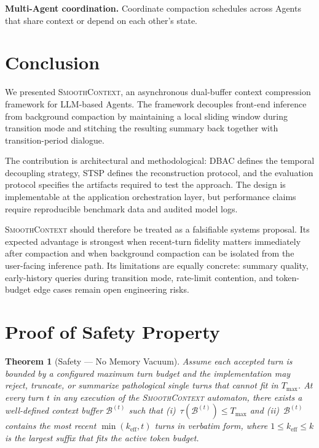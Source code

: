 \documentclass[10pt,twocolumn]{article}
\newtheorem{theorem}{Theorem}
\newcommand{\sys}{\textsc{SmoothContext}}
\newcommand{\Dtok}{\tau}
\newcommand{\Tmax}{T_{\max}}
\begin{document}
\textbf{Multi-Agent coordination.} Coordinate compaction schedules across Agents that share context or depend on each other's state.


\section{Conclusion}\label{sec:conclusion}

We presented \sys{}, an asynchronous dual-buffer context compression framework for LLM-based Agents. The framework decouples front-end inference from background compaction by maintaining a local sliding window during transition mode and stitching the resulting summary back together with transition-period dialogue.

The contribution is architectural and methodological: DBAC defines the temporal decoupling strategy, STSP defines the reconstruction protocol, and the evaluation protocol specifies the artifacts required to test the approach. The design is implementable at the application orchestration layer, but performance claims require reproducible benchmark data and audited model logs.

\sys{} should therefore be treated as a falsifiable systems proposal. Its expected advantage is strongest when recent-turn fidelity matters immediately after compaction and when background compaction can be isolated from the user-facing inference path. Its limitations are equally concrete: summary quality, early-history queries during transition mode, rate-limit contention, and token-budget edge cases remain open engineering risks.






\clearpage
\appendix

\section{Proof of Safety Property}\label{app:safety}

\begin{theorem}[Safety --- No Memory Vacuum]
  Assume each accepted turn is bounded by a configured maximum turn budget and the implementation may reject, truncate, or summarize pathological single turns that cannot fit in $\Tmax$. At every turn $t$ in any execution of the \sys{} automaton, there exists a well-defined context buffer $\mathcal{B}^{(t)}$ such that (i)~$\Dtok(\mathcal{B}^{(t)}) \leq \Tmax$ and (ii)~$\mathcal{B}^{(t)}$ contains the most recent $\min(k_{\mathrm{eff}}, t)$ turns in verbatim form, where $1 \leq k_{\mathrm{eff}} \leq k$ is the largest suffix that fits the active token budget.
\end{theorem}
\end{document}
